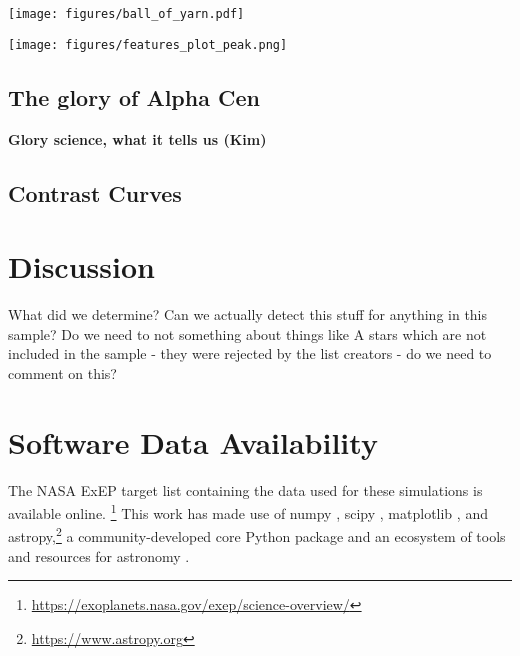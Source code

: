 \documentclass[
    usenatbib,
]{mnras}
\newcommand{\IWA}{\ensuremath{\mathrm{IWA}}}
\begin{document}
\begin{figure*}
    \centering
    \texttt{[image: figures/ball\_of\_yarn.pdf]}  
    \caption{
        An example of the eccentric orbits generated for the stellar sample. %
        The orbits are scaled by the Earth-equivalent flux distance. 
        The shaded region indicates \IWA's of 1, 2, 3 and 4\,$\lambda / D$ corresponding to 21, 42, 63 and \SI{84}{\mas}.
        The \IWA\ can significantly affect the range of scattering phases observable with each orbit.
    }
    \label{fig:ball-o-yarn}
\end{figure*}


 
\begin{figure*}
    \centering
    \texttt{[image: figures/features\_plot\_peak.png]}  
    \caption{
        Number of systems vs inner working angle
    }
    \label{fig:accessible_phase_angles}
\end{figure*}

\subsection{The glory of Alpha Cen}
\label{sec:ealpha-cen}
\textbf{Glory science, what it tells us (Kim)}

\subsection{Contrast Curves}
\label{sec:contrast}

\section{Discussion}
What did we determine? Can we actually detect this stuff for anything in this sample? Do we need to not something about things like A stars which are not included in the sample - they were rejected by the list creators - do we need to comment on this? 



\section*{Software Data Availability}
The NASA ExEP target list containing the data used for these simulations is available online.%
\footnote{\url{https://exoplanets.nasa.gov/exep/science-overview/}}
This work has made use of \textsf{numpy}
 \citep{NumPy2020}, \textsf{scipy} \citep{scipy_2020}, \textsf{matplotlib} \citep{matplotlib2007}, and \textsf{astropy},\footnote{\url{https://www.astropy.org}} a community-developed core Python package and an ecosystem of tools and resources for astronomy \citep{astropy:2013, astropy:2018, astropy:2022}.
\end{document}
